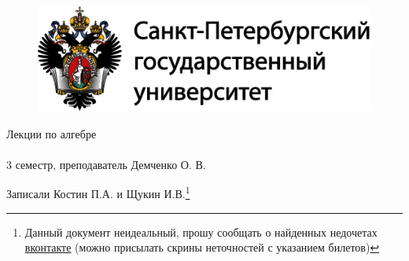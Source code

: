 \documentclass[main]{subfiles}
\begin{document}
	\begin{figure}[H]
			\includegraphics[width=12cm]{../../../template/spsu.jpg}
			\centering
	\end{figure}
	\vspace*{\fill}
	\begin{center}
		\huge Лекции по алгебре\\ \ \\
		\Large 3 семестр, преподаватель Демченко О. В.

		\large Записали Костин П.А. и Щукин И.В.\footnote{Данный документ неидеальный, прошу сообщать о найденных недочетах \href{https://vk.com/drab_existence_a}{вконтакте} (можно присылать скрины неточностей с указанием билетов)}
	\end{center}
	\vspace*{\fill}
	\vspace*{\fill}

	\newpage
	\tableofcontents
	\newpage
\end{document}
